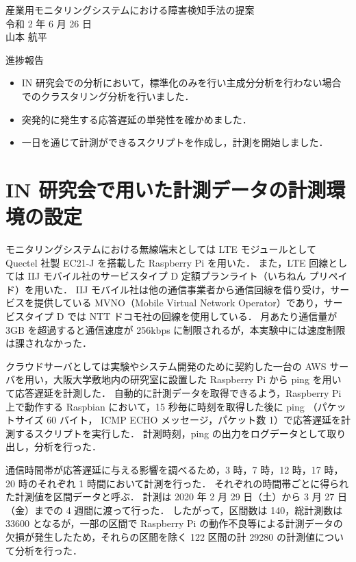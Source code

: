 \documentclass[a4j]{jarticle}
\begin{document}
\begin{table}[t]
\begin{center}
{\large 産業用モニタリングシステムにおける障害検知手法の提案}\\
令和 2 年 6 月 26 日\\
山本 航平
\end{center}
\end{table}

進捗報告
\begin{itemize}
\item IN 研究会での分析において，標準化のみを行い主成分分析を行わない場合でのクラスタリング分析を行いました．
\item 突発的に発生する応答遅延の単発性を確かめました．
\item 一日を通じて計測ができるスクリプトを作成し，計測を開始しました．
\end{itemize}

\section{IN 研究会で用いた計測データの計測環境の設定}
モニタリングシステムにおける無線端末としては LTE モジュールとして Quectel 社製 EC21-J を搭載した Raspberry Pi を用いた．
また，LTE 回線としては IIJ モバイル社のサービスタイプ D 定額プランライト（いちねん プリペイド）を用いた．
IIJ モバイル社は他の通信事業者から通信回線を借り受け，サービスを提供している MVNO（Mobile Virtual Network Operator）であり，サービスタイプ D では NTT ドコモ社の回線を使用している．
月あたり通信量が 3GB を超過すると通信速度が 256kbps に制限されるが，本実験中には速度制限は課されなかった．

クラウドサーバとしては実験やシステム開発のために契約した一台の AWS サーバを用い，大阪大学敷地内の研究室に設置した Raspberry Pi から ping を用いて応答遅延を計測した．
自動的に計測データを取得できるよう，Raspberry Pi 上で動作する Raspbian において，15 秒毎に時刻を取得した後に ping （パケットサイズ 60 バイト， ICMP ECHO メッセージ，パケット数 1）で応答遅延を計測するスクリプトを実行した．
計測時刻，ping の出力をログデータとして取り出し，分析を行った．

通信時間帯が応答遅延に与える影響を調べるため，3 時，7 時，12 時，17 時，20 時のそれぞれ 1 時間において計測を行った．
それぞれの時間帯ごとに得られた計測値を区間データと呼ぶ．
計測は 2020 年 2 月 29 日（土）から 3 月 27 日（金）までの 4 週間に渡って行った．
したがって，区間数は 140，総計測数は 33600 となるが，一部の区間で Raspberry Pi の動作不良等による計測データの欠損が発生したため，それらの区間を除く 122 区間の計 29280 の計測値について分析を行った．
\end{document}

